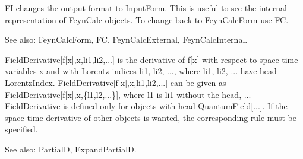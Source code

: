 

FI changes the output format to InputForm. This is useful to see the internal representation of FeynCalc objects. To change back to
  FeynCalcForm use FC.

See also:  FeynCalcForm, FC, FeynCalcExternal, FeynCalcInternal.



FieldDerivative[f[x],x,li1,li2,...] is the derivative of f[x] with respect to space-time variables x and with Lorentz indices li1, li2,
  ..., where li1, li2, ... have head LorentzIndex. FieldDerivative[f[x],x,li1,li2,...] can be given as
  FieldDerivative[f[x],x,\{l1,l2,...\}], where l1 is li1 without the head, ... FieldDerivative is defined only for objects with head
  QuantumField[...]. If the space-time derivative of other objects is wanted, the corresponding rule must be specified.

See also:  PartialD, ExpandPartialD.






